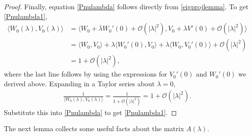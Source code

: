 \documentclass[thesis.tex]{subfiles}
\begin{document}
\begin{lemma}
\begin{proof}
Finally, equation \cref{Pnulambda} follows directly from \cref{eigprojlemma}. To get \cref{Pnulambda1},
\begin{align*}
\langle W_0(\lambda), V_0(\lambda) \rangle
&= \langle W_0 + \overline{\lambda} W_0'(0) + \mathcal{O}(|\lambda|^2),
V_0 + \lambda V'(0) + \mathcal{O}(|\lambda|^2) \rangle \\
&= \langle W_0, V_0 \rangle + \lambda \langle W_0'(0), V_0 \rangle + \lambda \langle W_0, V_0'(0) \rangle + \mathcal{O}(|\lambda|^2) \\
&= 1 + \mathcal{O}(|\lambda|^2),
\end{align*}
where the last line follows by using the expressions for $V_0'(0)$ and $W_0'(0)$ we derived above. Expanding in a Taylor series about $\lambda = 0$,
\begin{align*}
\frac{1}{\langle W_0(\lambda), V_0(\lambda) \rangle} = \frac{1}{1 + \mathcal{O}(|\lambda|^2)} = 1 + \mathcal{O}(|\lambda|^2).
\end{align*}
Substitute this into \cref{Pnulambda} to get \cref{Pnulambda1}.

\end{proof}
\end{lemma}

The next lemma collects some useful facts about the matrix $A(\lambda)$.
\end{document}
